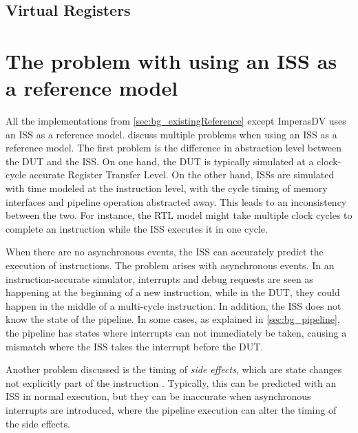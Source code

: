 \subsection{Virtual Registers}








\section{The problem with using an ISS as a reference model}
\label{sec:back_issProblem}

All the implementations from \cref{sec:bg_existingReference} except ImperasDV uses an ISS as a reference model. \textcite{taylorAdvancedRISCVVerification2023}  discuss multiple problems when using an ISS as a reference model. The first problem is the difference in abstraction level between the DUT and the ISS. On one hand, the DUT is typically simulated at a clock-cycle accurate Register Transfer Level. On the other hand, ISSs are simulated with time modeled at the instruction level, with the cycle timing of memory interfaces and pipeline operation abstracted away. This leads to an inconsistency between the two. For instance, the RTL model might take multiple clock cycles to complete an instruction while the ISS executes it in one cycle.

When there are no asynchronous events, the ISS can accurately predict the execution of instructions. The problem arises with asynchronous events. In an instruction-accurate simulator, interrupts and debug requests are seen as happening at the beginning of a new instruction, while in the DUT, they could happen in the middle of a multi-cycle instruction. In addition, the ISS does not know the state of the pipeline. In some cases, as explained in \cref{sec:bg_pipeline}, the pipeline has states where interrupts can not immediately be taken, causing a mismatch where the ISS takes the interrupt before the DUT.



Another problem discussed is the timing of \textit{side effects}, which are state changes not explicitly part of the instruction \cite{taylorAdvancedRISCVVerification2023}. Typically, this can be predicted with an ISS in normal execution, but they can be inaccurate when asynchronous interrupts are introduced, where the pipeline execution can alter the timing of the side effects.

